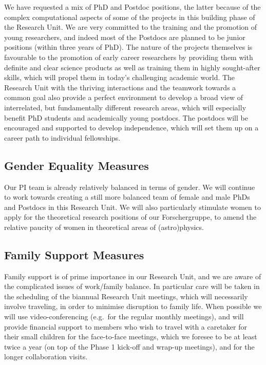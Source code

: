 \documentclass[10pt,fleqn,twoside]{article}
\begin{document}
\noindent We have requested a mix of PhD and Postdoc positions, the
latter because of the complex computational aspects of some of the
projects in this building phase of the Research Unit. We are very
committed to the training and the promotion of young researchers, and
indeed most of the Postdocs are planned to be junior positions (within
three years of PhD). The nature of the projects themselves is
favourable to the promotion of early career researchers by providing
them with definite and clear science products as well as training them
in highly sought-after skills, which will propel them in today's
challenging academic world. The Research Unit with the thriving
interactions and the teamwork towards a common goal also provide a
perfect environment to develop a broad view of interrelated, but
fundamentally different research areas, which will especially benefit
PhD students and academically young postdocs. The postdocs will be
encouraged and supported to develop independence, which will set them
up on a career path to individual fellowships. 

\subsection{Gender Equality Measures}

Our PI team is already relatively balanced in terms of gender. We will
continue to work towards creating a still
more balanced team of female and male PhDs and Postdocs in this
Research Unit. We will also particularly stimulate women to apply for the theoretical research positions of our Forschergruppe, to amend the relative paucity of women in theoretical areas of (astro)physics.

\subsection{Family Support Measures}

Family support is of prime importance in our Research Unit, and we are
aware of the complicated issues of work/family balance. In particular
care will be taken in the scheduling of the biannual Research Unit
meetings, which will necessarily involve traveling, in order to
minimise disruption to family life. When possible we will use
video-conferencing (e.g.\ for the regular monthly meetings), and will
provide financial support to members who wish to travel with a
caretaker for their small children
for the face-to-face meetings, which we foresee to be at
least twice a year (on top of the Phase 1 kick-off and wrap-up
meetings), and for the longer collaboration visits. 
\end{document}
